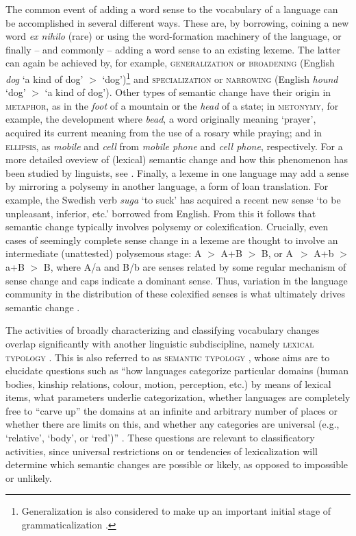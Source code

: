 \documentclass[output=paper]{langsci/langscibook}
\begin{document}
The common event of adding a word sense to the vocabulary of a
language can be accomplished in several different ways. These are, by
borrowing, coining a new word \emph{ex nihilo} (rare) or using the
word-formation machinery of the language, or finally -- and commonly
-- adding a word sense to an existing lexeme. The latter can again be
achieved by, for example, \textsc{generalization} or
\textsc{broadening} (English \emph{dog} `a kind of dog' $>$
`dog')\footnote{Generalization is also considered to make up an
  important initial stage of grammaticalization \citep{smith-2011}.}
and \textsc{specialization} or \textsc{narrowing} (English
\emph{hound} `dog' $>$ `a kind of dog'). Other types of semantic
change have their origin in \textsc{metaphor}, as in the \emph{foot}
of a mountain or the \emph{head} of a state; in \textsc{metonymy}, for
example, the development where \emph{bead}, a word originally meaning
`prayer', acquired its current meaning from the use of a rosary while
praying; and in \textsc{ellipsis}, as \emph{mobile} and \emph{cell} from
\emph{mobile phone} and \emph{cell phone}, respectively. For a more detailed oveview of (lexical) semantic change and how this phenomenon has been studied by linguists, see
\citet{urban-2015}. Finally, a lexeme in one language may add a sense
by mirroring a polysemy in another language, a form of loan
translation. For example, the Swedish verb \emph{suga} `to suck' has
acquired a recent new sense `to be unpleasant, inferior, etc.'
borrowed from English. From this it follows that semantic change
typically involves polysemy or colexification. Crucially, even cases
of seemingly complete sense change in a lexeme are thought to involve
an intermediate (unattested) polysemous stage: A $>$ A+B $>$ B, or A~$>$ 
A+b $>$ a+B $>$ B, where A/a and B/b are senses related by some
regular mechanism of sense change and caps indicate a dominant
sense. Thus, variation in the language community in the distribution
of these colexified senses is what ultimately drives semantic change
\citep{bowern2019semantic}.\largerpage

The activities of broadly characterizing and classifying vocabulary
changes overlap significantly with another linguistic subdiscipline,
namely \textsc{lexical typology}
\citep{k-tamm-2008,k-tamm-2012,k-tamm-etal-2016}. This is also
referred to as \textsc{semantic typology} \citep{riemer-2010}, whose
aims are to elucidate questions such as ``how languages categorize
particular domains (human bodies, kinship relations, colour, motion,
perception, etc.) by means of lexical items, what parameters underlie
categorization, whether languages are complete\-ly free to ``carve up''
the domains at an infinite and arbitrary number of places or whether
there are limits on this, and whether any categories are universal
(e.g., `relative', `body', or `red')''
\citep[434]{k-tamm-etal-2016}. These questions are relevant to
classificatory activities, since universal restrictions on or
tendencies of lexicalization will determine which semantic changes are
possible or likely, as opposed to impossible or unlikely.
\end{document}
